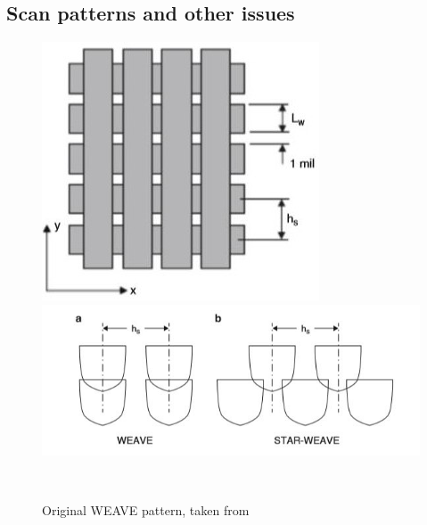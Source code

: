 \documentclass[a4paper, twoside, 11pt]{report}
\begin{document}
\subsection{Scan patterns and other issues}
%
\begin{figure}[!t]
  \centering
  \begin{minipage}[b]{0.45\textwidth}
    \includegraphics[width=\textwidth]{weave1}
  \end{minipage}
  \hfill
  \begin{minipage}[b]{0.45\textwidth}
    \includegraphics[width=\textwidth]{weave2}
  \end{minipage}
  \\[1pt]
  \begin{minipage}[t]{0.45\textwidth}
    \caption{Original WEAVE pattern, taken from \cite[p. 87]{AMT}}
  \end{minipage}
  \hfill
  \begin{minipage}[t]{0.45\textwidth}

\end{minipage}
\end{figure}
\end{document}
